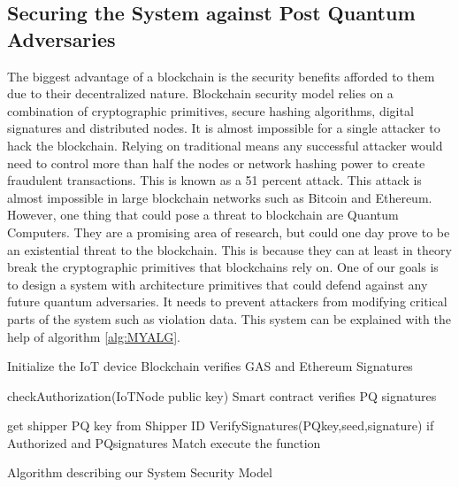 \subsection{Securing the System against Post Quantum Adversaries}
The biggest advantage of a blockchain is the security benefits afforded to them due to their decentralized nature. Blockchain security model relies on a combination of cryptographic primitives, secure hashing algorithms, digital signatures and distributed nodes. It is almost impossible for a single attacker to hack the blockchain. Relying on traditional means any successful attacker would need to control more than half the nodes or network hashing power to create fraudulent transactions. This is known as a 51 percent attack. This attack is almost impossible in large blockchain networks such as Bitcoin and Ethereum. However, one thing that could pose a threat to blockchain are Quantum Computers. They are a promising area of research, but could one day prove to be an existential threat to the blockchain. This is because they can at least in theory break the cryptographic primitives that blockchains rely on. One of our goals is to design a system with architecture primitives that could defend against any future quantum adversaries. It needs to prevent attackers from modifying critical parts of the system such as violation data. This system can be explained with the help of algorithm \ref{alg:MYALG}.  

\begin{algorithm}[h]
  Initialize the IoT device\;
 Blockchain verifies GAS and Ethereum Signatures\;
  {
 checkAuthorization(IoTNode public key)\; 
 Smart contract verifies PQ signatures\;
 
 	get shipper PQ key from Shipper ID\;
 	VerifySignatures(PQkey,seed,signature)\;
 	if Authorized and PQsignatures Match execute the function\;
 
 }
\caption{Algorithm describing our System Security Model}
\label{alg:MYALG} 
\end{algorithm}

